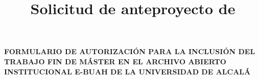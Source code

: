 
\graphicspath{{../../logos/}{../../figures/}{../../diagrams/}} %
 



\title{Solicitud de anteproyecto de \myWorkTypeFull} %
\date{\myThesisProposalDate}                               %
\author{\myAuthorFullName}


\pagestyle{empty}

% 


% 

\begin{spacing}{1.0}
\begin{center}

  \Large\textbf{FORMULARIO DE AUTORIZACIÓN PARA LA INCLUSIÓN DEL
    TRABAJO FIN DE MÁSTER EN EL ARCHIVO ABIERTO INSTITUCIONAL E-BUAH
    DE LA UNIVERSIDAD DE ALCALÁ}

\end{center}
\end{spacing}
\vspace{0.5cm}

